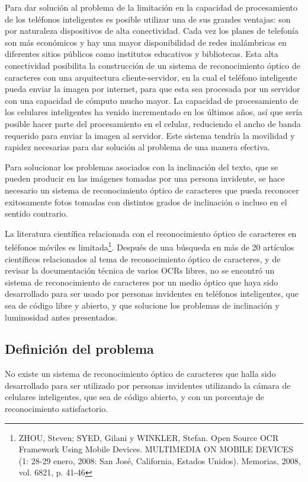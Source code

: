 \documentclass[a4paper, 11pt, oneside]{report}
\begin{document}
Para dar solución al problema de la limitación en la capacidad de procesamiento de los teléfonos inteligentes es posible utilizar una de sus grandes ventajas: son por naturaleza dispositivos de alta conectividad. Cada vez los planes de telefonía son más económicos y hay una mayor disponibilidad de redes inalámbricas en diferentes sitios públicos como institutos educativos y bibliotecas. Esta alta conectividad posibilita la construcción de un sistema de reconocimiento óptico de caracteres con una arquitectura cliente-servidor, en la cual el teléfono inteligente pueda enviar la imagen por internet, para que esta sea procesada por un servidor con una capacidad de cómputo mucho mayor. La capacidad de procesamiento de los celulares inteligentes ha venido incrementado en los últimos años, así que sería posible hacer parte del procesamiento en el celular, reduciendo el ancho de banda requerido para enviar la imagen al servidor. Este sistema tendría la movilidad y rapidez necesarias para dar solución al problema de una manera efectiva.

Para solucionar los problemas asociados con la inclinación del texto, que se pueden producir en las imágenes tomadas por una persona invidente, se hace necesario un sistema de reconocimiento óptico de caracteres que pueda reconocer exitosamente fotos tomadas con distintos grados de inclinación o incluso en el sentido contrario.

La literatura científica relacionada con el reconocimiento óptico de caracteres en teléfonos móviles es limitada\footnote{ZHOU, Steven; SYED, Gilani y WINKLER, Stefan. Open Source OCR Framework Using Mobile Devices. MULTIMEDIA ON MOBILE DEVICES (1: 28-29 enero, 2008: San José, California, Estados Unidos). Memorias, 2008, vol. 6821, p. 41-46}. Después de una búsqueda en más de 20 artículos científicos relacionados al tema de reconocimiento óptico de caracteres, y de revisar la documentación técnica de varios OCRs libres, no se encontró un sistema de reconocimiento de caracteres por un medio óptico que haya sido desarrollado para ser usado por personas invidentes en teléfonos inteligentes, que sea de código libre y abierto, y que solucione los problemas de inclinación y luminosidad antes presentados.

\subsection{Definición del problema}

No existe un sistema de reconocimiento óptico de caracteres que halla sido desarrollado para ser utilizado por personas invidentes utilizando la cámara de celulares inteligentes, que sea de código abierto, y con un porcentaje de reconocimiento satisfactorio.
\end{document}
